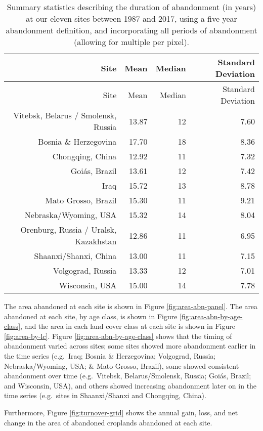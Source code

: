 \documentclass[9pt,twocolumn,twoside,lineno]{pnas-new}
\begin{document}
\begin{longtable}[]{@{}rrrr@{}}
\caption{\label{tab:summary-stats-table}Summary statistics describing the duration of abandonment (in years) at our eleven sites between 1987 and 2017, using a five year abandonment definition, and incorporating all periods of abandonment (allowing for multiple per pixel).}\tabularnewline
\toprule
Site & Mean & Median & Standard Deviation \\
\midrule
\endfirsthead
\toprule
Site & Mean & Median & Standard Deviation \\
\midrule
\endhead
Vitebsk, Belarus / Smolensk, Russia & 13.87 & 12 & 7.60 \\
Bosnia \& Herzegovina & 17.70 & 18 & 8.36 \\
Chongqing, China & 12.92 & 11 & 7.32 \\
Goiás, Brazil & 13.61 & 12 & 7.42 \\
Iraq & 15.72 & 13 & 8.78 \\
Mato Grosso, Brazil & 15.30 & 11 & 9.21 \\
Nebraska/Wyoming, USA & 15.32 & 14 & 8.04 \\
Orenburg, Russia / Uralsk, Kazakhstan & 12.86 & 11 & 6.95 \\
Shaanxi/Shanxi, China & 13.00 & 11 & 7.15 \\
Volgograd, Russia & 13.33 & 12 & 7.01 \\
Wisconsin, USA & 15.00 & 14 & 7.78 \\
\bottomrule
\end{longtable}

The area abandoned at each site is shown in Figure \ref{fig:area-abn-panel}.
The area abandoned at each site, by age class, is shown in Figure \ref{fig:area-abn-by-age-class}, and the area in each land cover class at each site is shown in Figure \ref{fig:area-by-lc}.
Figure \ref{fig:area-abn-by-age-class} shows that the timing of abandonment varied across sites; some sites showed more abandonment earlier in the time series (e.g.~Iraq; Bosnia \& Herzegovina; Volgograd, Russia; Nebraska/Wyoming, USA; \& Mato Grosso, Brazil), some showed consistent abandonment over time (e.g.~Vitebsk, Belarus/Smolensk, Russia; Goiás, Brazil; and Wisconsin, USA), and others showed increasing abandonment later on in the time series (e.g.~sites in Shaanxi/Shanxi and Chongqing, China).

Furthermore, Figure \ref{fig:turnover-grid} shows the annual gain, loss, and net change in the area of abandoned croplands abandoned at each site.
\end{document}

